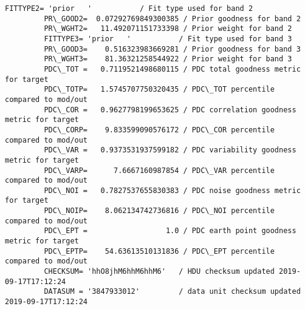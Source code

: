 \documentclass[11pt]{article}
\begin{document}
\begin{Verbatim}[commandchars=\\\{\}]
         FITTYPE2= 'prior   '           / Fit type used for band 2                       
         PR\_GOOD2=  0.07292769849300385 / Prior goodness for band 2                      
         PR\_WGHT2=   11.492071151733398 / Prior weight for band 2                        
         FITTYPE3= 'prior   '           / Fit type used for band 3                       
         PR\_GOOD3=    0.516323983669281 / Prior goodness for band 3                      
         PR\_WGHT3=    81.36321258544922 / Prior weight for band 3                        
         PDC\_TOT =   0.7119521498680115 / PDC total goodness metric for target           
         PDC\_TOTP=   1.5745707750320435 / PDC\_TOT percentile compared to mod/out         
         PDC\_COR =   0.9627798199653625 / PDC correlation goodness metric for target     
         PDC\_CORP=    9.833599090576172 / PDC\_COR percentile compared to mod/out         
         PDC\_VAR =   0.9373531937599182 / PDC variability goodness metric for target     
         PDC\_VARP=      7.6667160987854 / PDC\_VAR percentile compared to mod/out         
         PDC\_NOI =   0.7827537655830383 / PDC noise goodness metric for target           
         PDC\_NOIP=    8.062134742736816 / PDC\_NOI percentile compared to mod/out         
         PDC\_EPT =                  1.0 / PDC earth point goodness metric for target     
         PDC\_EPTP=    54.63613510131836 / PDC\_EPT percentile compared to mod/out         
         CHECKSUM= 'hhO8jhM6hhM6hhM6'   / HDU checksum updated 2019-09-17T17:12:24       
         DATASUM = '3847933012'         / data unit checksum updated 2019-09-17T17:12:24 
\end{Verbatim}
            
    \begin{center}
    \end{center}
    { \hspace*{\fill} \\}
    
\end{document}

